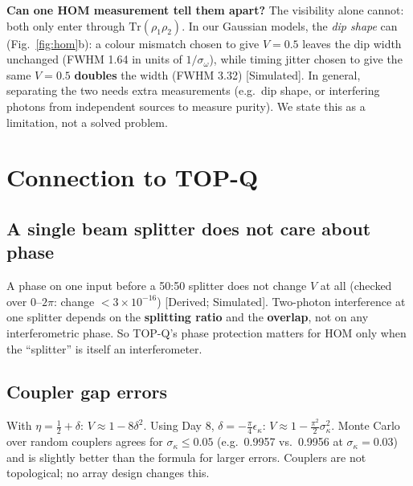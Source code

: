\documentclass[10pt,a4paper]{article}
\newcommand{\evd}[1]{\textsf{\small[#1]}}
\begin{document}
\textbf{Can one HOM measurement tell them apart?} The visibility alone cannot: both only enter through $\mathrm{Tr}(\rho_1\rho_2)$. In our Gaussian models, the \emph{dip shape} can (Fig.~\ref{fig:hom}b): a colour mismatch chosen to give $V=0.5$ leaves the dip width unchanged (FWHM 1.64 in units of $1/\sigma_\omega$), while timing jitter chosen to give the same $V=0.5$ \textbf{doubles} the width (FWHM 3.32) \evd{Simulated}. In general, separating the two needs extra measurements (e.g.\ dip shape, or interfering photons from independent sources to measure purity). We state this as a limitation, not a solved problem.

\section{Connection to TOP-Q}
\subsection{A single beam splitter does not care about phase}
A phase on one input before a 50:50 splitter does not change $V$ at all (checked over $0$--$2\pi$: change $<3\times10^{-16}$) \evd{Derived; Simulated}. Two-photon interference at one splitter depends on the \textbf{splitting ratio} and the \textbf{overlap}, not on any interferometric phase. So TOP-Q's phase protection matters for HOM only when the ``splitter'' is itself an interferometer.

\subsection{Coupler gap errors}
With $\eta=\tfrac12+\delta$: $V\approx1-8\delta^2$. Using Day 8, $\delta=-\frac\pi4\epsilon_\kappa$: $\boxed{V\approx1-\tfrac{\pi^2}{2}\sigma_\kappa^2}$. Monte Carlo over random couplers agrees for $\sigma_\kappa\le0.05$ (e.g.\ 0.9957 vs.\ 0.9956 at $\sigma_\kappa=0.03$) and is slightly better than the formula for larger errors. Couplers are not topological; no array design changes this.
\end{document}
